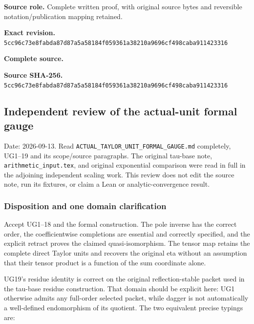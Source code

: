 \documentclass{article}
\begin{document}
\maketitle
\begingroup
\sloppy
\small

\noindent\textbf{Source role.} Complete written proof, with original source bytes and reversible notation/publication mapping retained.\par
\noindent\textbf{Exact revision.} \nolinkurl{5cc96c73e8fabda87d87a5a58184f059361a38210a9696cf498caba911423316}\par
\noindent\textbf{Complete source.} \par
\noindent\textbf{Source SHA-256.} \nolinkurl{5cc96c73e8fabda87d87a5a58184f059361a38210a9696cf498caba911423316}\par\medskip
\subsection{Independent review of the actual-unit formal gauge}\label{endpoint-f1_unit_gauge_review--independent-review-of-the-actual-unit-formal-gauge}

Date: 2026-09-13. Read \nolinkurl{ACTUAL_TAYLOR_UNIT_FORMAL_GAUGE.md} completely, UG1--19 and its scope/source paragraphs. The original tau-base note, \nolinkurl{arithmetic_input.tex}, and original exponential comparison were read in full in the adjoining independent scaling work. This review does not edit the source note, run its fixtures, or claim a Lean or analytic-convergence result.

\subsubsection{Disposition and one domain clarification}\label{endpoint-f1_unit_gauge_review--disposition-and-one-domain-clarification}

Accept UG1--18 and the formal construction. The pole inverse has the correct order, the coefficientwise completions are essential and correctly specified, and the explicit retract proves the claimed quasi-isomorphism. The tensor map retains the complete direct Taylor units and recovers the original eta without an assumption that their tensor product is a function of the sum coordinate alone.

UG19's residue identity is correct on the original reflection-stable packet used in the tau-base residue construction. That domain should be explicit here: UG1 otherwise admits any full-order selected packet, while dagger is not automatically a well-defined endomorphism of its quotient. The two equivalent precise typings are:
\end{document}
